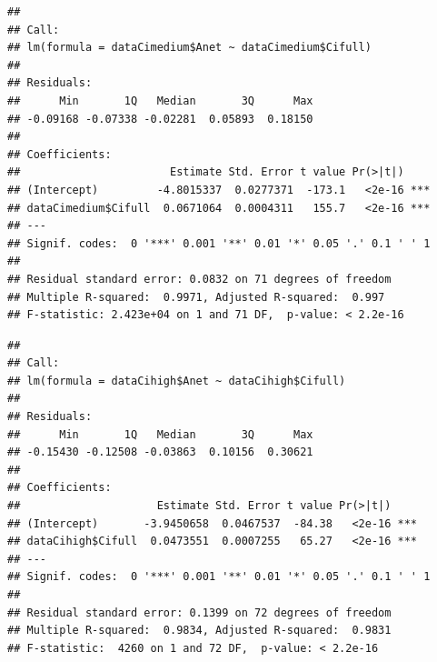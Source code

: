 \documentclass[
]{krantz}
\makeatletter
\newenvironment{Shaded}{\begin{snugshade}}{\end{snugshade}}
\newcommand{\DecValTok}[1]{\textcolor[rgb]{0.00,0.00,0.81}{#1}}
\newcommand{\FunctionTok}[1]{\textcolor[rgb]{0.00,0.00,0.00}{#1}}
\newcommand{\NormalTok}[1]{#1}
\newcommand{\OtherTok}[1]{\textcolor[rgb]{0.56,0.35,0.01}{#1}}
\newcommand{\SpecialCharTok}[1]{\textcolor[rgb]{0.00,0.00,0.00}{#1}}
\newenvironment{kframe}{%
\medskip{}
\setlength{\fboxsep}{.8em}
 \def\at@end@of@kframe{}%
 \ifinner\ifhmode%
  \def\at@end@of@kframe{\end{minipage}}%
  \begin{minipage}{\columnwidth}%
 \fi\fi%
 \def\FrameCommand##1{\hskip\@totalleftmargin \hskip-\fboxsep
 \colorbox{shadecolor}{##1}\hskip-\fboxsep
     \hskip-\linewidth \hskip-\@totalleftmargin \hskip\columnwidth}%
 \MakeFramed {\advance\hsize-\width
   \@totalleftmargin\z@ \linewidth\hsize
   \@setminipage}}%
 {\par\unskip\endMakeFramed%
 \at@end@of@kframe}
\renewenvironment{Shaded}{\begin{kframe}}{\end{kframe}}
\makeatother
\begin{document}
\begin{verbatim}
## 
## Call:
## lm(formula = dataCimedium$Anet ~ dataCimedium$Cifull)
## 
## Residuals:
##      Min       1Q   Median       3Q      Max 
## -0.09168 -0.07338 -0.02281  0.05893  0.18150 
## 
## Coefficients:
##                       Estimate Std. Error t value Pr(>|t|)    
## (Intercept)         -4.8015337  0.0277371  -173.1   <2e-16 ***
## dataCimedium$Cifull  0.0671064  0.0004311   155.7   <2e-16 ***
## ---
## Signif. codes:  0 '***' 0.001 '**' 0.01 '*' 0.05 '.' 0.1 ' ' 1
## 
## Residual standard error: 0.0832 on 71 degrees of freedom
## Multiple R-squared:  0.9971, Adjusted R-squared:  0.997 
## F-statistic: 2.423e+04 on 1 and 71 DF,  p-value: < 2.2e-16
\end{verbatim}

\begin{Shaded}
\end{Shaded}

\begin{verbatim}
## 
## Call:
## lm(formula = dataCihigh$Anet ~ dataCihigh$Cifull)
## 
## Residuals:
##      Min       1Q   Median       3Q      Max 
## -0.15430 -0.12508 -0.03863  0.10156  0.30621 
## 
## Coefficients:
##                     Estimate Std. Error t value Pr(>|t|)    
## (Intercept)       -3.9450658  0.0467537  -84.38   <2e-16 ***
## dataCihigh$Cifull  0.0473551  0.0007255   65.27   <2e-16 ***
## ---
## Signif. codes:  0 '***' 0.001 '**' 0.01 '*' 0.05 '.' 0.1 ' ' 1
## 
## Residual standard error: 0.1399 on 72 degrees of freedom
## Multiple R-squared:  0.9834, Adjusted R-squared:  0.9831 
## F-statistic:  4260 on 1 and 72 DF,  p-value: < 2.2e-16
\end{verbatim}
\end{document}
